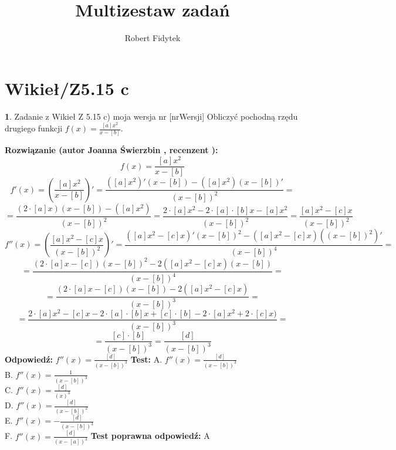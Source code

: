 \documentclass[12pt, a4paper]{article}
\title{Multizestaw zadań}
\author{Robert Fidytek}
\date{}
\theoremstyle{definition} %
\newtheorem{zad}{}
\newcommand{\kategoria}[1]{\section{#1}} %
\newcommand{\zadStart}[1]{\begin{zad}#1\newline} %
\newcommand{\zadStop}{\end{zad}}   %
\newcommand{\rozwStart}[2]{\noindent \textbf{Rozwiązanie (autor #1 , recenzent #2): }\newline} %
\newcommand{\rozwStop}{\newline}                                            %
\newcommand{\odpStart}{\noindent \textbf{Odpowiedź:}\newline}    %
\newcommand{\odpStop}{\newline}                                             %
\newcommand{\testStart}{\noindent \textbf{Test:}\newline} %
\newcommand{\testStop}{\newline} %
\newcommand{\kluczStart}{\noindent \textbf{Test poprawna odpowiedź:}\newline} %
\newcommand{\kluczStop}{\newline} %
\begin{document}
\maketitle


\kategoria{Wikieł/Z5.15 c}
\zadStart{Zadanie z Wikieł Z 5.15 c) moja wersja nr [nrWersji]}
Obliczyć pochodną rzędu drugiego funkcji $f(x)=\frac{[a]x^2}{x-[b]}$.
\zadStop
\rozwStart{Joanna Świerzbin}{}
$$f(x)=\frac{[a]x^2}{x-[b]}$$
$$f'(x)= \left( \frac{[a]x^2}{x-[b]} \right)' = \frac{([a]x^2)'(x-[b])-([a]x^2)(x-[b])'}{(x-[b])^2} =$$
$$= \frac{(2\cdot[a]x)(x-[b])-([a]x^2)}{(x-[b])^2} = \frac{2\cdot[a]x^2-2\cdot[a]\cdot[b]x-[a]x^2}{(x-[b])^2} = \frac{[a]x^2-[c]x}{(x-[b])^2} $$
$$f''(x)= \left( \frac{[a]x^2-[c]x}{(x-[b])^2} \right)'= \frac{([a]x^2-[c]x)'(x-[b])^2-([a]x^2-[c]x)((x-[b])^2)'}{(x-[b])^4} = $$
$$= \frac{(2\cdot[a]x-[c])(x-[b])^2-2([a]x^2-[c]x)(x-[b])}{(x-[b])^4} = $$
$$= \frac{(2\cdot[a]x-[c])(x-[b])-2([a]x^2-[c]x)}{(x-[b])^3} = $$
$$= \frac{2\cdot[a]x^2-[c]x -2\cdot[a]\cdot[b]x+[c]\cdot[b]-2\cdot[a]x^2+2\cdot[c]x)}{(x-[b])^3} = $$
$$= \frac{[c]\cdot[b]}{(x-[b])^3} = \frac{[d]}{(x-[b])^3} $$
\rozwStop
\odpStart
$f''(x) = \frac{[d]}{(x-[b])^3} $
\odpStop
\testStart
A. $f''(x) = \frac{[d]}{(x-[b])^3} $\\
B. $f''(x) = \frac{1}{(x-[b])^3} $ \\
C. $f''(x) = \frac{[d]}{(x)^3} $\\
D. $f''(x) = \frac{[d]}{(x-[b])^2} $\\
E. $f''(x) = -\frac{[d]}{(x-[b])^3} $\\
F. $f''(x) = \frac{[d]}{(x-[a])^3} $
\testStop
\kluczStart
A
\kluczStop
\end{document}
